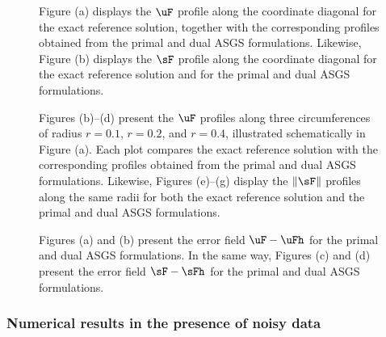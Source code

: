 \begin{figure}[ht!!]
	\centering
	\caption{Figure (a) displays the $\uF$ profile along the coordinate diagonal for the exact reference solution, together with the corresponding profiles obtained from the primal and dual ASGS formulations. Likewise, Figure (b) displays the $\sF$ profile along the coordinate diagonal for the exact reference solution and for the primal and dual ASGS formulations.}
	\fontsize{12pt}{10pt}\selectfont 
	\def\svgwidth{0.8\columnwidth}
	
	\label{fig:plot_over_line_u_s_primal_dual_ASGS}
\end{figure}

\begin{figure}[ht!!]
	\centering
	\caption{Figures (b)--(d) present the $\uF$ profiles along three circumferences of radius $r = 0.1$, $r = 0.2$, and $r = 0.4$, illustrated schematically in Figure (a). Each plot compares the exact reference solution with the corresponding profiles obtained from the primal and dual ASGS formulations. Likewise, Figures (e)--(g) display the $\|\sF\|$ profiles along the same radii for both the exact reference solution and the primal and dual ASGS formulations.}
	\fontsize{8pt}{10pt}\selectfont 
	\def\svgwidth{1.0\columnwidth}
	
	\label{fig:plot_over_curve_u_s_primal_dual_ASGS}
\end{figure}

\begin{figure}[ht!!]
	\centering
	\caption{Figures (a) and (b) present the error field $\uF - \uFh$ for the primal and dual ASGS formulations. In the same way, Figures (c) and (d) present the error field $\sF - \sFh$ for the primal and dual ASGS formulations.}
	\fontsize{12pt}{10pt}\selectfont 
	\def\svgwidth{1.0\columnwidth}
	
	\label{fig:inclusion_udif_sdif_primal_dual_ASGS}
\end{figure}

\subsubsection*{Numerical results in the presence of noisy data}

